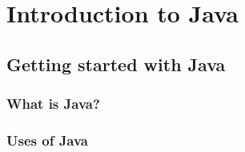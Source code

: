 \documentclass[14pt,fleqn]{extbook} %
\newcommand\blankpage{%
	\null
	\thispagestyle{empty}%
	\addtocounter{page}{-1}%
	\newpage}
\begin{document}
\afterpage{\blankpage}
\afterpage{\blankpage}




\usechapterimagetrue %


\pagestyle{empty} %


\tableofcontents



\cleardoublepage %

\pagestyle{fancy} %



%
\chapter{Introduction to Java}
\section{Getting started with Java}
%
\subsection{What is Java?}

\subsection{Uses of Java}

\end{document}

